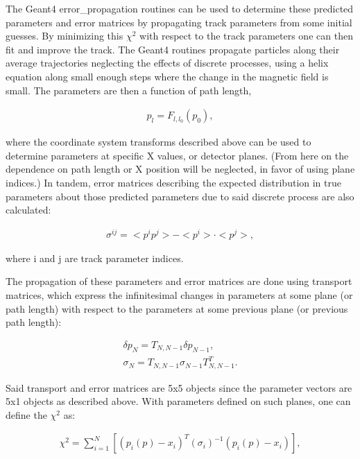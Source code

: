 \documentclass{article}
\begin{document}
The Geant4 error\_propagation routines can be used to determine these predicted parameters and error matrices by propagating track parameters from some initial guesses. By minimizing this $\chi^{2}$ with respect to the track parameters one can then fit and improve the track. The Geant4 routines propagate particles along their average trajectories neglecting the effects of discrete processes, using a helix equation along small enough steps where the change in the magnetic field is small. The parameters are then a function of path length, 

\begin{align} \label{eq:pp}
p_{l} = F_{l,l_{0}}(p_{0}),
\end{align}

where the coordinate system transforms described above can be used to determine parameters at specific X values, or detector planes. (From here on the dependence on path length or X position will be neglected, in favor of using plane indices.) In tandem, error matrices describing the expected distribution in true parameters about those predicted parameters due to said discrete process are also calculated:

\begin{align} \label{eq:sigma}
\sigma^{ij} = <p^{i}p^{j}> - <p^{i}> \cdot <p^{j}>,
\end{align} 

where i and j are track parameter indices.

The propagation of these parameters and error matrices are done using transport matrices, which express the infinitesimal changes in parameters at some plane (or path length) with respect to the parameters at some previous plane (or previous path length):

\begin{align} \label{eq:transport}
\delta p_{N} = T_{N,N-1} \delta p_{N-1}, \\
\sigma_{N} = T_{N,N-1} \sigma_{N-1} T_{N,N-1}^{T}.
\end{align}
 
Said transport and error matrices are 5x5 objects since the parameter vectors are 5x1 objects as described above. With parameters defined on such planes, one can define the $\chi^{2}$ as: 

\begin{align} \label{eq:chi2sum}
\chi^2 = \sum_{i=1}^{N} [(p_{i}(p)-x_{i})^{T}(\sigma_{i})^{-1}(p_{i}(p)-x_{i})],
\end{align}
\end{document}
